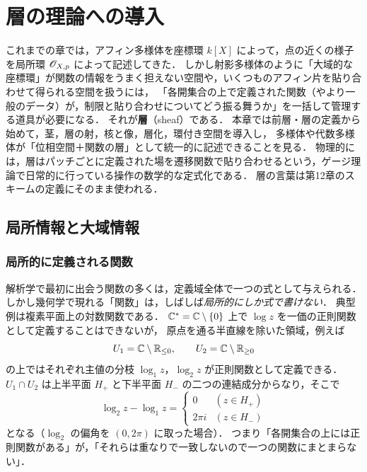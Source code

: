 \chapter{層の理論への導入}
\label{ch:ch11}

\begin{chapterlead}
これまでの章では，アフィン多様体を座標環 $k[X]$ によって，点の近くの様子を局所環 $\mathscr{O}_{X,p}$ によって記述してきた．
しかし射影多様体のように「大域的な座標環」が関数の情報をうまく担えない空間や，いくつものアフィン片を貼り合わせて得られる空間を扱うには，
「各開集合の上で定義された関数（やより一般のデータ）が，制限と貼り合わせについてどう振る舞うか」を一括して管理する道具が必要になる．
それが\textbf{層}（sheaf）である．
本章では前層・層の定義から始めて，茎，層の射，核と像，層化，環付き空間を導入し，
多様体や代数多様体が「位相空間＋関数の層」として統一的に記述できることを見る．
物理的には，層はパッチごとに定義された場を遷移関数で貼り合わせるという，ゲージ理論で日常的に行っている操作の数学的な定式化である．
層の言葉は第12章のスキームの定義にそのまま使われる．
\end{chapterlead}

\section{局所情報と大域情報}

\subsection{局所的に定義される関数}

解析学で最初に出会う関数の多くは，定義域全体で一つの式として与えられる．
しかし幾何学で現れる「関数」は，しばしば\emph{局所的にしか式で書けない}．
典型例は複素平面上の対数関数である．
$\mathbb{C}^* = \mathbb{C}\setminus\{0\}$ 上で $\log z$ を一価の正則関数として定義することはできないが，
原点を通る半直線を除いた領域，例えば
\[
  U_1 = \mathbb{C}\setminus \mathbb{R}_{\le 0},\qquad U_2 = \mathbb{C} \setminus \mathbb{R}_{\ge 0}
\]
の上ではそれぞれ主値の分枝 $\log_1 z$，$\log_2 z$ が正則関数として定義できる．
$U_1\cap U_2$ は上半平面 $H_+$ と下半平面 $H_-$ の二つの連結成分からなり，そこで
\[
  \log_2 z - \log_1 z =
  \begin{cases} 0 & (z\in H_+)\\ 2\pi i & (z\in H_-)\end{cases}
\]
となる（$\log_2$ の偏角を $(0,2\pi)$ に取った場合）．
つまり「各開集合の上には正則関数がある」が，「それらは重なりで一致しないので一つの関数にまとまらない」．

